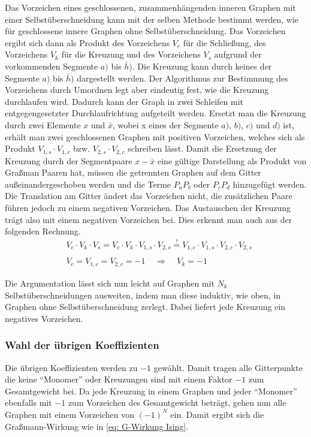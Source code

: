 Das Vorzeichen eines geschlossenen, zusammenhängenden inneren Graphen mit einer Selbstüberschneidung kann mit der selben Methode bestimmt werden, wie für geschlossene innere Graphen ohne Selbstüberschneidung. Das Vorzeichen ergibt sich dann als Produkt des Vorzeichens $V_c$ für die Schließung, des Vorzeichens $V_k$ für die Kreuzung und des Vorzeichens $V_s$ aufgrund der vorkommenden Segmente $a)$ bis $\bar h)$. Die Kreuzung kann durch keines der Segmente $a)$ bis $\bar h)$ dargestellt werden. Der Algorithmus zur Bestimmung des Vorzeichens durch Umordnen legt aber eindeutig fest, wie die Kreuzung durchlaufen wird. Dadurch kann der Graph in zwei Schleifen mit entgegengesetzter Durchlaufrichtung aufgeteilt werden. Ersetzt man die Kreuzung durch zwei Elemente $x$ und $\bar x$, wobei x eines der Segmente  $a)$, $b)$, $c)$ und $d)$ ist, erhält man zwei geschlossenen Graphen mit positiven Vorzeichen, welches sich als Produkt $V_{1,s}\cdot V_{1,c}$ bzw. $V_{2,s}\cdot V_{2,c}$ schreiben lässt. Damit die Ersetzung der Kreuzung durch der Segmentpaare $x-\bar x$ eine gültige Darstellung als Produkt von Graßman Paaren hat, müssen die getrennten Graphen auf dem Gitter außeinandergeschoben werden und die Terme $P_a P_b$ oder $P_c P_d$ hinzugefügt werden. Die Translation am Gitter ändert das Vorzeichen nicht, die zusätzlichen Paare führen jedoch zu einem negativen Vorzeichen. Das Austauschen der Kreuzung trägt also mit einem negativen Vorzeichen bei. Dies erkennt man auch aus der folgenden Rechnung.
\begin{equation}
\begin{aligned}
&V_c \cdot V_k \cdot V_s = V_c \cdot V_k \cdot V_{1,s} \cdot V_{2,s}   \overset{!}{=} V_{1,c} \cdot V_{1,s}  \cdot V_{2,c} \cdot V_{2,s} \\
\\
& V_{c} =  V_{1,c} = V_{2,c} = -1  \;\;\;\;\Rightarrow\;\;\;\;   V_k = -1
\end{aligned}
\end{equation}

\noindent Die Argumentation lässt sich nun leicht auf Graphen mit $N_k$ Selbstüberschneidungen ausweiten, indem man diese induktiv, wie oben, in Graphen ohne Selbstüberschneidung zerlegt. Dabei liefert jede Kreuzung ein negatives Vorzeichen. 

\subsubsection{Wahl der übrigen Koeffizienten} \label{sec: Wahl der übrigen Koeffizienten}
Die übrigen Koeffizienten werden zu $-1$ gewählt. Damit tragen alle Gitterpunkte die keine ``Monomer'' oder Kreuzungen sind mit einem Faktor $-1$ zum Gesamtgewicht bei. Da jede Kreuzung in einem Graphen und jeder ``Monomer'' ebenfalls mit $-1$ zum Vorzeichen des  Gesamtgewicht beträgt, gehen nun alle Graphen mit einem Vorzeichen von $(-1)^N$ ein. Damit ergibt sich die Graßmann-Wirkung wie in \eqref{eq: G-Wirkung Ising}.  
 
